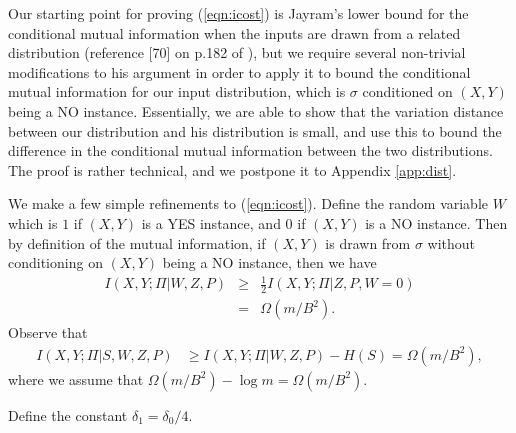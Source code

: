 \documentclass[twoside,leqno,twocolumn]{article}
\begin{document}
Our starting point for proving (\ref{eqn:icost}) is 
Jayram's lower bound for the conditional mutual information when the inputs
are drawn from a related distribution 
(reference [70] on p.182 of \cite{BarYossefThesis}),
but we require several non-trivial modifications to his argument 
in order to apply it to bound the conditional mutual information for our input distribution, 
which is $\sigma$ conditioned
on $(X,Y)$ being a NO instance. Essentially, we are able to show that the variation
distance between our distribution and his distribution is small, and use this to
bound the difference in the conditional mutual information between the two distributions.
The proof is rather technical, and we postpone it to Appendix \ref{app:dist}. 

We make a few simple refinements to (\ref{eqn:icost}).  Define the random variable
$W$ which is $1$ if $(X,Y)$ is a YES instance, and $0$ if $(X,Y)$ is a
NO instance. Then by definition of the mutual information, 
if $(X,Y)$ is drawn from
$\sigma$ without conditioning on $(X,Y)$ being a NO instance, then we have
\begin{eqnarray*}
I(X, Y ; \Pi | W, Z, P) & \geq & \frac{1}{2} I(X, Y ; \Pi | Z, P, W = 0)\\
& = & \Omega(m/B^2).
\end{eqnarray*}
Observe that
\begin{align}\label{eqn:mutInf}
I(X, Y ; \Pi | S, W, Z, P) &\geq I(X, Y ; \Pi | W, Z, P) - H(S) 
= \Omega(m/B^2),
\end{align}
where we assume that $\Omega(m/B^2) - \log m = \Omega(m/B^2)$. 
\iffalse Next, we look at $1$-way protocols $\Pi$. In this case $\Pi =
(A, b)$, where $A = A(X)$ is Alice's single message to Bob, and $b$ is
Bob's output bit. By the chain rule,
\begin{eqnarray*}
I(X, Y ; (A,b) | S, W, Z) & = & I(A ; X, Y | S, W, Z) + I(b ; X,Y | A, S, W, Z)\\
& \leq & I(A ; X, Y | S, W, Z) + 1,
\end{eqnarray*}
since $b$ is just a single bit. Again, by the chain rule,
$$I(A ; X, Y | S, W, Z) = I(A ; X | S, W, Z) + I(A ; Y | X, S, W, Z) = I(A ; X | S, W, Z),$$
since $H(A | X, S, W, Z) = H(A | Y, X, S, W, Z) = 0$ since the
protocol is $1$-way. It follows by (\ref{eqn:mutInf}) that assuming
$Cm/B^2- 2 - \log m = \Omega(m/B^2)$,
\begin{eqnarray}\label{eqn:final}
I(X ; A | S, W, Z) = \Omega(m/B^2).
\end{eqnarray}
\fi
Define the constant $\delta_1 = \delta_0/4$. 
\end{document}
